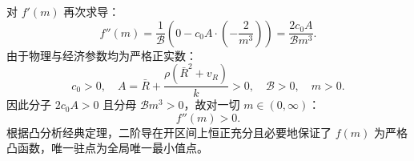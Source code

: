对 $f'(m)$ 再次求导：
\begin{equation}
f''(m) = \frac{1}{\mathcal{B}} \left( 0 - c_0 A \cdot \left( -\frac{2}{m^3} \right) \right) = \frac{2 c_0 A}{\mathcal{B} m^3}.
\end{equation}
由于物理与经济参数均为严格正实数：
\begin{equation}
c_0 > 0, \quad A = \bar{R} + \frac{\rho(\bar{R}^2 + v_R)}{k} > 0, \quad \mathcal{B} > 0, \quad m > 0.
\end{equation}
因此分子 $2 c_0 A > 0$ 且分母 $\mathcal{B} m^3 > 0$，故对一切 $m \in (0, \infty)$：
\begin{equation}
f''(m) > 0.
\end{equation}
根据凸分析经典定理，二阶导在开区间上恒正充分且必要地保证了 $f(m)$ 为严格凸函数，唯一驻点为全局唯一最小值点。
